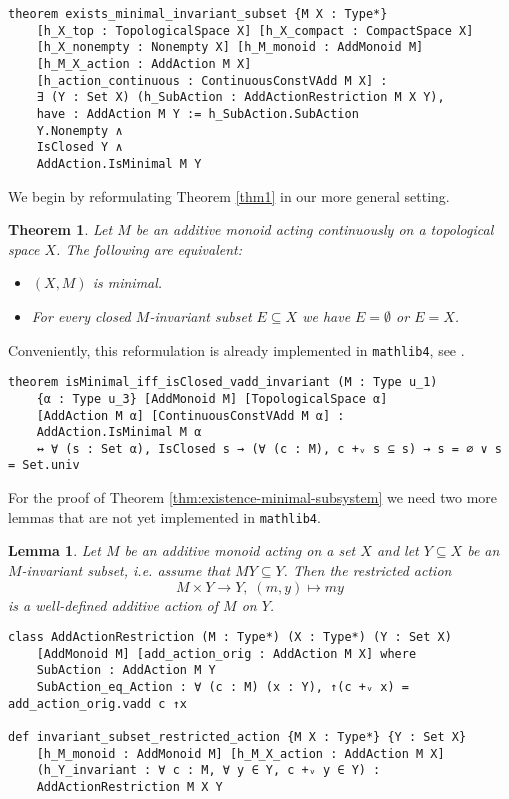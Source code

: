 \documentclass[11pt]{article}
\newtheorem{theorem}{Theorem}
\newtheorem{lemma}{Lemma}[section]
\theoremstyle{definition}              %
\theoremstyle{definition}              %
\theoremstyle{definition}              %
\begin{document}
\begin{lstlisting}
theorem exists_minimal_invariant_subset {M X : Type*} 
    [h_X_top : TopologicalSpace X] [h_X_compact : CompactSpace X] 
    [h_X_nonempty : Nonempty X] [h_M_monoid : AddMonoid M] 
    [h_M_X_action : AddAction M X] 
    [h_action_continuous : ContinuousConstVAdd M X] :
    ∃ (Y : Set X) (h_SubAction : AddActionRestriction M X Y),
    have : AddAction M Y := h_SubAction.SubAction
    Y.Nonempty ∧
    IsClosed Y ∧
    AddAction.IsMinimal M Y
\end{lstlisting}

We begin by reformulating Theorem \ref{thm1} in our more general setting.

\begin{theorem}\label{prop:minimal-equivalence}
Let $M$ be an additive monoid acting continuously on a topological space $X$. The following are equivalent:
\begin{itemize}
  \item $(X, M)$ is minimal.
  \item For every closed $M$-invariant subset $E \subseteq X$ we have $E = \emptyset$ or $E = X$.
\end{itemize}
\end{theorem}

Conveniently, this reformulation is already implemented in \texttt{mathlib4}, see \cite{kudry}.

\begin{lstlisting}
theorem isMinimal_iff_isClosed_vadd_invariant (M : Type u_1) 
    {α : Type u_3} [AddMonoid M] [TopologicalSpace α] 
    [AddAction M α] [ContinuousConstVAdd M α] :
    AddAction.IsMinimal M α
    ↔ ∀ (s : Set α), IsClosed s → (∀ (c : M), c +ᵥ s ⊆ s) → s = ∅ ∨ s = Set.univ
\end{lstlisting}



For the proof of Theorem \ref{thm:existence-minimal-subsystem} we need two more lemmas that are not yet implemented in \texttt{mathlib4}.

\begin{lemma}\label{lemma:restricted-action}
Let $M$ be an additive monoid acting on a set $X$ and let $Y \subseteq X$ be an $M$-invariant subset, i.e. assume that $MY \subseteq Y$. Then the restricted action 
\[M \times Y \to Y, \; (m,y) \mapsto my\] 
is a well-defined additive action of $M$ on $Y$.
\end{lemma}


\begin{lstlisting}
class AddActionRestriction (M : Type*) (X : Type*) (Y : Set X) 
    [AddMonoid M] [add_action_orig : AddAction M X] where
    SubAction : AddAction M Y
    SubAction_eq_Action : ∀ (c : M) (x : Y), ↑(c +ᵥ x) = add_action_orig.vadd c ↑x

def invariant_subset_restricted_action {M X : Type*} {Y : Set X} 
    [h_M_monoid : AddMonoid M] [h_M_X_action : AddAction M X] 
    (h_Y_invariant : ∀ c : M, ∀ y ∈ Y, c +ᵥ y ∈ Y) : 
    AddActionRestriction M X Y
\end{lstlisting}
\end{document}
